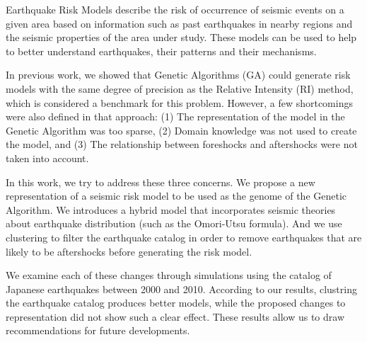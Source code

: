 Earthquake Risk Models describe the risk of occurrence of seismic
events on a given area based on information such as past earthquakes
in nearby regions and the seismic properties of the area under study.
These models can be used to help to better understand earthquakes,
their patterns and their mechanisms.

In previous work, we showed that Genetic Algorithms (GA) could
generate risk models with the same degree of precision as the Relative
Intensity (RI) method, which is considered a benchmark for this
problem.  However, a few shortcomings were also defined in that
approach: (1) The representation of the model in the Genetic Algorithm
was too sparse, (2) Domain knowledge was not used to create the model,
and (3) The relationship between foreshocks and aftershocks were not 
taken into account.

In this work, we try to address these three concerns. We propose a new
representation of a seismic risk model to be used as the genome of the
Genetic Algorithm. We introduces a hybrid model that incorporates
seismic theories about earthquake distribution (such as the Omori-Utsu
formula). And we use clustering to filter the earthquake catalog in
order to remove earthquakes that are likely to be aftershocks before
generating the risk model.

We examine each of these changes through simulations using the catalog
of Japanese earthquakes between 2000 and 2010. According to our
results, clustring the earthquake catalog produces better models,
while the proposed changes to representation did not show such a clear
effect. These results allow us to draw recommendations for future
developments.
